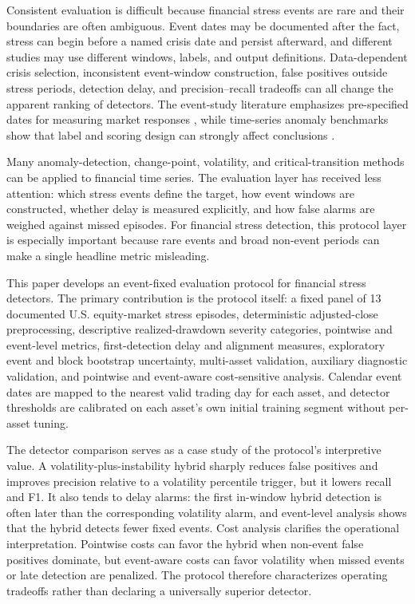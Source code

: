 \documentclass[10pt,twocolumn]{article}
\begin{document}
Consistent evaluation is difficult because financial stress events are rare and their boundaries are often ambiguous. Event dates may be documented after the fact, stress can begin before a named crisis date and persist afterward, and different studies may use different windows, labels, and output definitions. Data-dependent crisis selection, inconsistent event-window construction, false positives outside stress periods, detection delay, and precision--recall tradeoffs can all change the apparent ranking of detectors. The event-study literature emphasizes pre-specified dates for measuring market responses \cite{brown1985,mackinlay1997}, while time-series anomaly benchmarks show that label and scoring design can strongly affect conclusions \cite{lavin2015,wu2022}.

Many anomaly-detection, change-point, volatility, and critical-transition methods can be applied to financial time series. The evaluation layer has received less attention: which stress events define the target, how event windows are constructed, whether delay is measured explicitly, and how false alarms are weighed against missed episodes. For financial stress detection, this protocol layer is especially important because rare events and broad non-event periods can make a single headline metric misleading.

This paper develops an event-fixed evaluation protocol for financial stress detectors. The primary contribution is the protocol itself: a fixed panel of 13 documented U.S. equity-market stress episodes, deterministic adjusted-close preprocessing, descriptive realized-drawdown severity categories, pointwise and event-level metrics, first-detection delay and alignment measures, exploratory event and block bootstrap uncertainty, multi-asset validation, auxiliary diagnostic validation, and pointwise and event-aware cost-sensitive analysis. Calendar event dates are mapped to the nearest valid trading day for each asset, and detector thresholds are calibrated on each asset's own initial training segment without per-asset tuning.

The detector comparison serves as a case study of the protocol's interpretive value. A volatility-plus-instability hybrid sharply reduces false positives and improves precision relative to a volatility percentile trigger, but it lowers recall and F1. It also tends to delay alarms: the first in-window hybrid detection is often later than the corresponding volatility alarm, and event-level analysis shows that the hybrid detects fewer fixed events. Cost analysis clarifies the operational interpretation. Pointwise costs can favor the hybrid when non-event false positives dominate, but event-aware costs can favor volatility when missed events or late detection are penalized. The protocol therefore characterizes operating tradeoffs rather than declaring a universally superior detector.
\end{document}
